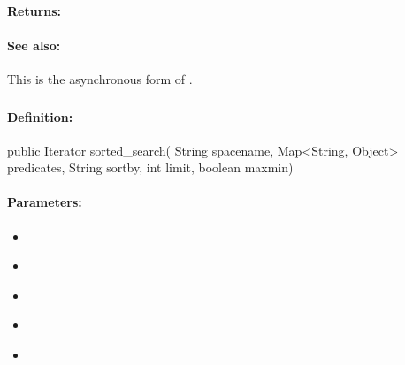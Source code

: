 \paragraph{Returns:}


\paragraph{See also:}  This is the asynchronous form of .

\pagebreak
\subsubsection{}
\label{api:java:sorted_search}


\paragraph{Definition:}
\begin{javacode}
public Iterator sorted_search(
        String spacename,
        Map<String, Object> predicates,
        String sortby,
        int limit,
        boolean maxmin)
\end{javacode}

\paragraph{Parameters:}
\begin{itemize}[noitemsep]
\item {}\\

\item {}\\

\item {}\\

\item {}\\

\item {}\\

\end{itemize}


